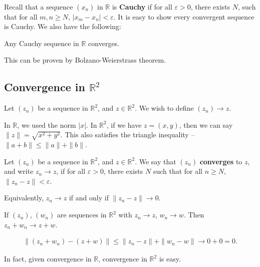 \documentclass[12pt]{article}
\begin{document}
Recall that a sequence $(x_n)$ in $\mathbb{R}$ is \textbf{Cauchy} if for all $\varepsilon > 0$, there exists $N$, such that for all $m, n \geq N$, $|x_m - x_n| < \varepsilon$. It is easy to show every convergent sequence is Cauchy. We also have the following:

\begin{theorem}
\item
	Any Cauchy sequence in $\mathbb{R}$ converges.
\end{theorem}

This can be proven by Bolzano-Weierstrass theorem.

\subsection{Convergence in \texorpdfstring{$\mathbb{R}^2$}{R\^2}}%
\label{sub:convergence_in_r_2_}

Let $(z_n)$ be a sequence in $\mathbb{R}^2$, and $z \in \mathbb{R}^2$. We wish to define $(z_n) \to z$.

In $\mathbb{R}$, we used the norm $|x|$. In $\mathbb{R}^2$, if we have $z = (x, y)$, then we can say $\|z\| = \sqrt{x^2 + y^2}$. This also satisfies the triangle inequality -- $\|a + b\| \leq \|a\| + \|b\|$.

\begin{definition}
	Let $(z_n)$ be a sequence in $\mathbb{R}^2$, and $z \in \mathbb{R}^2$. We say that $(z_n)$ \textbf{converges} to $z$, and write $z_n \to z$, if for all $\varepsilon > 0$, there exists $N$ such that for all $n \geq N$, $\|z_n - z\| < \varepsilon$.

	Equivalently, $z_n \to z$ if and only if $\|z_n - z\| \to 0$.
\end{definition}
\begin{lemma}
	If $(z_n)$, $(w_n)$ are sequences in $\mathbb{R}^2$ with $z_n \to z$, $w_n \to w$. Then $z_n + w_n \to z + w$.
\end{lemma}

\begin{proofbox}
\begin{align*}
	\|(z_n + w_n) - (z + w)\| \leq \|z_n - z\| + \|w_n - w\| \to 0 + 0 = 0.
\end{align*}
\end{proofbox}

In fact, given convergence in $\mathbb{R}$, convergence in $\mathbb{R}^2$ is easy.
\end{document}
